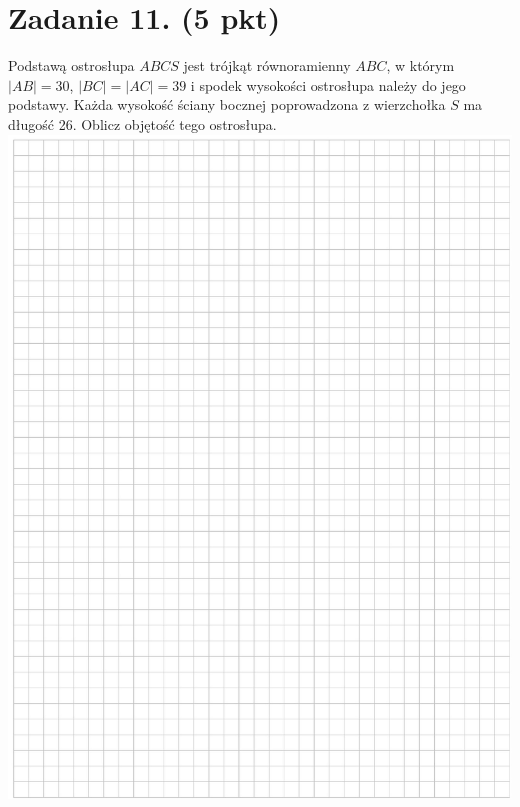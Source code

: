 \documentclass[10pt]{article}
\begin{document}
\section*{Zadanie 11. (5 pkt)}
Podstawą ostrosłupa \(A B C S\) jest trójkąt równoramienny \(A B C\), w którym \(|A B|=30\), \(|B C|=|A C|=39\) i spodek wysokości ostrosłupa należy do jego podstawy. Każda wysokość ściany bocznej poprowadzona z wierzchołka \(S\) ma długość 26. Oblicz objętość tego ostrosłupa.\\
\includegraphics[max width=\textwidth, center]{2024_11_21_d9af6ed2d610d3f2d2cbg-16}\\
\end{document}
